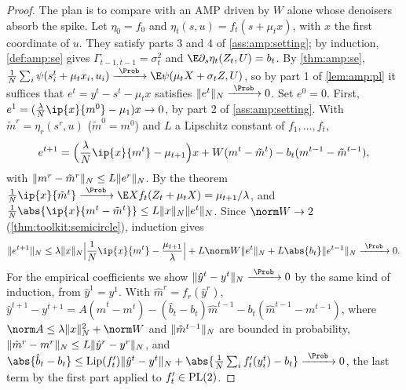 \begin{refsection}
\begin{proof}
The plan is to compare with an AMP driven by $W$ alone whose denoisers absorb the spike. Let $\eta_0=f_0$ and $\eta_t(s,u)=f_t(s+\mu_tx)$, with $x$ the first coordinate of $u$. They satisfy parts 3 and 4 of \cref{ass:amp:setting}; by induction, \cref{def:amp:se} gives $\Gamma_{t-1,t-1}=\sigma_t^2$ and $\E\partial_s\eta_t(Z_t,U)=b_t$. By \cref{thm:amp:se}, $\frac1N\sum_i\psi(s^t_i+\mu_tx_i,u_i)\ampto\E\psi(\mu_tX+\sigma_tZ,U)$, so by part 1 of \cref{lem:amp:pl} it suffices that $e^t=y^t-s^t-\mu_tx$ satisfies $\ampnorm{e^t}\ampto0$. Set $e^0=0$. First, $e^1=(\frac\lambda N\ip{x}{m^0}-\mu_1)x\to0$, by part 2 of \cref{ass:amp:setting}. With $\tilde m^r=\eta_r(s^r,u)$ ($\tilde m^0=m^0$) and $L$ a Lipschitz constant of $f_1,\dots,f_t$,
\[
e^{t+1}=\Bigl(\frac\lambda N\ip{x}{m^t}-\mu_{t+1}\Bigr)x+W(m^t-\tilde m^t)-b_t(m^{t-1}-\tilde m^{t-1}),
\]
with $\lVert m^r-\tilde m^r\rVert_N\le L\lVert e^r\rVert_N$. By the theorem $\frac1N\ip{x}{\tilde m^t}\ampto\E Xf_t(Z_t+\mu_tX)=\mu_{t+1}/\lambda$, and $\frac1N\abs{\ip{x}{m^t-\tilde m^t}}\le L\ampnorm x\ampnorm{e^t}$. Since $\norm W\to2$ (\cref{thm:toolkit:semicircle}), induction gives
\[
\ampnorm{e^{t+1}}\le\lambda\ampnorm x\Bigl|\frac1N\ip{x}{m^t}-\frac{\mu_{t+1}}\lambda\Bigr|+L\norm W\ampnorm{e^t}+L\abs{b_t}\ampnorm{e^{t-1}}\ampto0.
\]
For the empirical coefficients we show $\ampnorm{\hat y^t-y^t}\ampto0$ by the same kind of induction, from $\hat y^1=y^1$. With $\hat m^r=f_r(\hat y^r)$, $\hat y^{t+1}-y^{t+1}=A(\hat m^t-m^t)-(\hat b_t-b_t)\hat m^{t-1}-b_t(\hat m^{t-1}-m^{t-1})$, where $\norm A\le\lambda\ampnorm x^2+\norm W$ and $\lVert \hat m^{t-1}\rVert_N$ are bounded in probability, $\lVert \hat m^r-m^r\rVert_N\le L\lVert \hat y^r-y^r\rVert_N$, and $\abs{\hat b_t-b_t}\le\mathrm{Lip}(f_t')\ampnorm{\hat y^t-y^t}+\abs{\frac1N\sum_if_t'(y^t_i)-b_t}\ampto0$, the last term by the first part applied to $f_t'\in\mathrm{PL}(2)$.
\end{proof}



\end{refsection}
